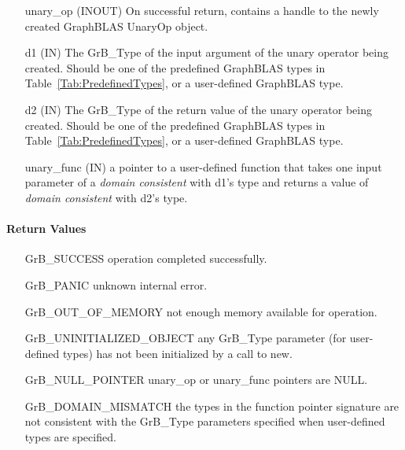 \begin{itemize}[leftmargin=1.1in]
    \item[{\sf unary\_op}] ({\sf INOUT}) On successful return, contains a
                           handle to the newly created GraphBLAS UnaryOp object.
    \item[{\sf d1}] ({\sf IN})  The {\sf GrB\_Type} of the input 
                           argument of the unary operator being created.  Should be 
                           one of the predefined GraphBLAS types in 
                           Table~\ref{Tab:PredefinedTypes}, or a user-defined GraphBLAS type.
    \item[{\sf d2}] ({\sf IN})  The {\sf GrB\_Type} of the return value of the unary 
                           operator being created.  Should be one of the predefined 
                           GraphBLAS types in Table~\ref{Tab:PredefinedTypes}, or a 
                           user-defined GraphBLAS type.
    \item[{\sf unary\_func}] ({\sf IN})  a pointer to a user-defined function that takes 
                           one input parameter of a \emph{domain consistent} with {\sf d1}'s type
                           and returns a value of \emph{domain consistent} with {\sf d2}'s type. 
\end{itemize}

\paragraph{Return Values}

\begin{itemize}[leftmargin=2.1in]
\item[{\sf GrB\_SUCCESS}]           operation completed successfully.
\item[{\sf GrB\_PANIC}]             unknown internal error.
\item[{\sf GrB\_OUT\_OF\_MEMORY}]          not enough memory available for operation.
\item[{\sf GrB\_UNINITIALIZED\_OBJECT}]          any {\sf GrB\_Type} parameter (for
                                    user-defined types) has not been
                                    initialized by a call to {\sf new}.
\item[{\sf GrB\_NULL\_POINTER}]    {\sf unary\_op} or {\sf unary\_func}
                                    pointers are {\sf NULL}.
\item[{\sf GrB\_DOMAIN\_MISMATCH}]  the types in the function pointer signature
                                    are not consistent with the {\sf GrB\_Type}
                                    parameters specified when user-defined types
                                    are specified.
\end{itemize}

